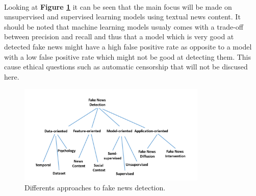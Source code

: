 \paragraph{} Looking at \textbf{Figure \ref{fig:intro:features}} it can be seen that the main focus will be made on unsupervised and supervised learning models using textual news content. It should be noted that machine learning models usualy comes with a trade-off between precision and recall and thus that a model which is very good at detected fake news might have a high false positive rate as opposite to a model with a low false positive rate which might not be good at detecting them. This cause ethical questions such as automatic censorship that will not be discused here. 

\begin{figure}
	\centering
	\includegraphics[width=0.8\textwidth]{chapter/images/introduction/features}
	\caption{Differents approaches to fake news detection.}
	\label{fig:intro:features}
\end{figure}